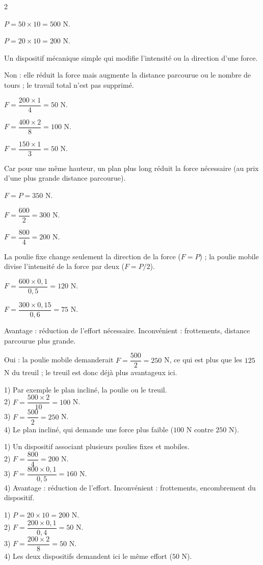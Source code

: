 \begin{multicols}{2}

$P=50\times10=500$ N.

$P=20\times10=200$ N.

Un dispositif mécanique simple qui modifie l'intensité ou la direction d'une force.

Non : elle réduit la force mais augmente la distance parcourue ou le nombre de tours ; le
travail total n'est pas supprimé.

$F=\dfrac{200\times1}4=50$ N.

$F=\dfrac{400\times2}8=100$ N.

$F=\dfrac{150\times1}3=50$ N.

Car pour une même hauteur, un plan plus long réduit la force nécessaire (au prix d'une
plus grande distance parcourue).

$F=P=350$ N.

$F=\dfrac{600}2=300$ N.

$F=\dfrac{800}4=200$ N.

La poulie fixe change seulement la direction de la force ($F=P$) ; la poulie mobile
divise l'intensité de la force par deux ($F=P/2$).

$F=\dfrac{600\times0{,}1}{0{,}5}=120$ N.

$F=\dfrac{300\times0{,}15}{0{,}6}=75$ N.

Avantage : réduction de l'effort nécessaire. Inconvénient : frottements, distance
parcourue plus grande.

Oui : la poulie mobile demanderait $F=\dfrac{500}2=250$ N, ce qui est plus que les $125$
N du treuil ; le treuil est donc déjà plus avantageux ici.

1) Par exemple le plan incliné, la poulie ou le treuil.\\
2) $F=\dfrac{500\times2}{10}=100$ N.\\
3) $F=\dfrac{500}2=250$ N.\\
4) Le plan incliné, qui demande une force plus faible ($100$ N contre $250$ N).

1) Un dispositif associant plusieurs poulies fixes et mobiles.\\
2) $F=\dfrac{800}4=200$ N.\\
3) $F=\dfrac{800\times0{,}1}{0{,}5}=160$ N.\\
4) Avantage : réduction de l'effort. Inconvénient : frottements, encombrement du
dispositif.

1) $P=20\times10=200$ N.\\
2) $F=\dfrac{200\times0{,}1}{0{,}4}=50$ N.\\
3) $F=\dfrac{200\times2}8=50$ N.\\
4) Les deux dispositifs demandent ici le même effort ($50$ N).

\end{multicols}
\exercicesBanner
